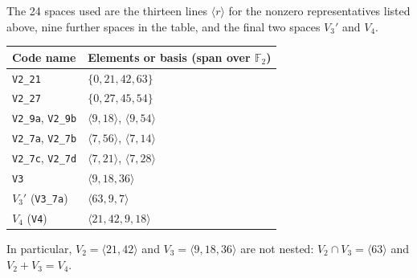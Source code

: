 \documentclass[11pt,a4paper]{article}
\newcommand{\F}{\mathbb F_2}
\begin{document}
The 24 spaces used are the thirteen lines $\langle r\rangle$ for the
nonzero representatives listed above, nine further spaces in the table,
and the final two spaces $V_3'$ and $V_4$.
\begin{center}\small
\begin{tabular}{ll}
\toprule
Code name & Elements or basis (span over $\F$)\\\midrule
\texttt{V2\_21} & $\{0,21,42,63\}$\\
\texttt{V2\_27} & $\{0,27,45,54\}$\\
\texttt{V2\_9a}, \texttt{V2\_9b} & $\langle9,18\rangle$, $\langle9,54\rangle$\\
\texttt{V2\_7a}, \texttt{V2\_7b} & $\langle7,56\rangle$, $\langle7,14\rangle$\\
\texttt{V2\_7c}, \texttt{V2\_7d} & $\langle7,21\rangle$, $\langle7,28\rangle$\\
\texttt{V3} & $\langle9,18,36\rangle$\\
$V_3'$ (\texttt{V3\_7a}) & $\langle63,9,7\rangle$\\
$V_4$ (\texttt{V4}) & $\langle21,42,9,18\rangle$\\\bottomrule
\end{tabular}
\end{center}
In particular, $V_2=\langle21,42\rangle$ and $V_3=\langle9,18,36\rangle$
are not nested: $V_2\cap V_3=\langle63\rangle$ and $V_2+V_3=V_4$.
\end{document}
